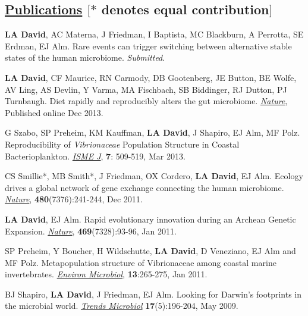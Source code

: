 \documentclass[overlapped,line,11pt]{res}
\begin{document}
\begin{resume}
\section{\underline{\sc Publications} \hspace{2.95in} \sc $[\ast$ denotes equal
      contribution$]$}

\vspace{.25in}

\begin{revnumerate}[11]

\item {\textbf{LA David}, AC Materna, J Friedman, I Baptista, MC
  Blackburn, A Perrotta, SE Erdman, EJ Alm.  Rare events can
  trigger switching between alternative stable states of the human
  microbiome.  \emph{Submitted}.}

\item {\textbf{LA David}, CF Maurice, RN Carmody, DB Gootenberg, JE
  Button, BE Wolfe, AV Ling, AS Devlin, Y Varma, MA Fischbach, SB
  Biddinger, RJ Dutton, PJ Turnbaugh.  Diet rapidly and reproducibly
  alters the gut microbiome. \emph{\underline{Nature}}, Published
  online Dec 2013.}

\item {G Szabo, SP Preheim, KM Kauffman, \textbf{LA David}, J Shapiro,
  EJ Alm, MF Polz.  Reproducibility of \emph{Vibrionaceae} Population
  Structure in Coastal Bacterioplankton. \emph{\underline{ISME J}},
  \textbf{7}: 509-519, Mar 2013.}

\item {CS Smillie*, MB Smith*, J Friedman, OX Cordero, \textbf{LA
    David}, EJ Alm.  Ecology drives a global network of gene exchange
  connecting the human microbiome. \emph{\underline{Nature}},
  \textbf{480}(7376):241-244, Dec 2011.}

\item {\textbf{LA David}, EJ Alm.  Rapid evolutionary innovation during
  an Archean Genetic Expansion.  \emph{\underline{Nature}},
  \textbf{469}(7328):93-96, Jan 2011.}

\vspace*{1mm}
\item {SP Preheim, Y Boucher, H Wildschutte, \textbf{LA David},
  D Veneziano, EJ Alm and MF Polz.  Metapopulation
  structure of Vibrionaceae among coastal marine
  invertebrates. \emph{\underline{Environ Microbiol}}, \textbf{13}:265-275, Jan 2011.} 

\vspace*{1mm}
\item {BJ Shapiro, \textbf{LA David}, J Friedman, EJ Alm. Looking for
Darwin's footprints in the microbial world.  \emph{\underline{Trends Microbiol}}
\textbf{17}(5):196-204, May 2009.}


\end{revnumerate}
\end{resume}
\end{document}
